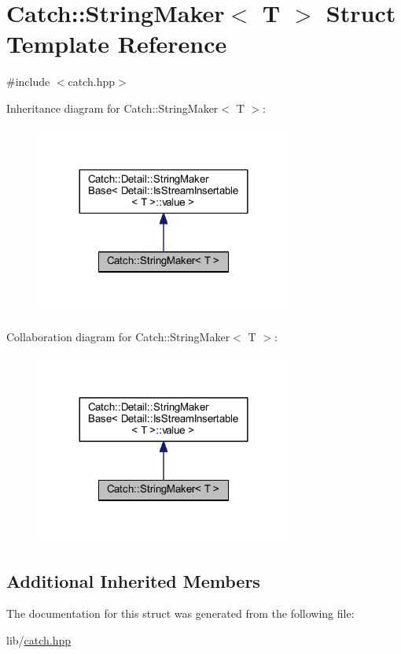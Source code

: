 \hypertarget{struct_catch_1_1_string_maker}{}\section{Catch\+:\+:String\+Maker$<$ T $>$ Struct Template Reference}
\label{struct_catch_1_1_string_maker}


{\ttfamily \#include $<$catch.\+hpp$>$}



Inheritance diagram for Catch\+:\+:String\+Maker$<$ T $>$\+:\nopagebreak
\begin{figure}[H]
\begin{center}
\leavevmode
\includegraphics[width=240pt]{struct_catch_1_1_string_maker__inherit__graph}
\end{center}
\end{figure}


Collaboration diagram for Catch\+:\+:String\+Maker$<$ T $>$\+:\nopagebreak
\begin{figure}[H]
\begin{center}
\leavevmode
\includegraphics[width=240pt]{struct_catch_1_1_string_maker__coll__graph}
\end{center}
\end{figure}
\subsection*{Additional Inherited Members}


The documentation for this struct was generated from the following file\+:\begin{DoxyCompactItemize}
\item 
lib/\hyperlink{catch_8hpp}{catch.\+hpp}\end{DoxyCompactItemize}

